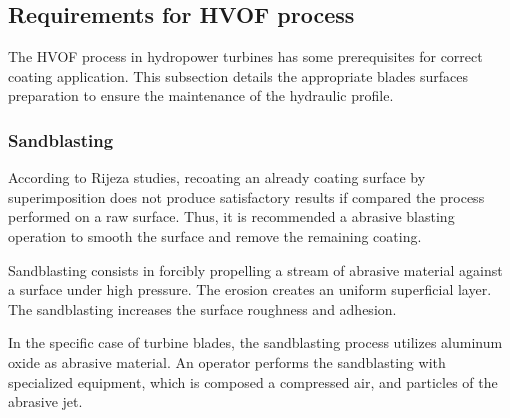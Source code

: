 \subsection{Requirements for HVOF process}

The HVOF process in hydropower turbines has some prerequisites for correct
coating application. This subsection details the appropriate blades surfaces
preparation to ensure the maintenance of the hydraulic profile.

\subsubsection{Sandblasting}\label{sandblasting}

According to Rijeza studies, recoating an already coating surface by
superimposition does not produce satisfactory results if compared the process
performed on a raw surface. Thus, it is recommended a abrasive blasting
operation to smooth the surface and remove the remaining coating.

Sandblasting consists in forcibly propelling a stream of abrasive material
against a surface under high pressure. The erosion creates an uniform
superficial layer. The sandblasting increases the surface roughness and
adhesion.

In the specific case of turbine blades, the sandblasting process utilizes
aluminum oxide as abrasive material. An operator performs the sandblasting with
specialized equipment, which is composed a compressed air, and particles
of the abrasive jet.

